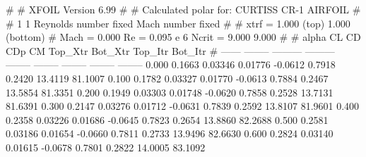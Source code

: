 #  
#       XFOIL         Version 6.99
#  
# Calculated polar for: CURTISS CR-1 AIRFOIL                            
#  
# 1 1 Reynolds number fixed          Mach number fixed         
#  
# xtrf =   1.000 (top)        1.000 (bottom)  
# Mach =   0.000     Re =     0.095 e 6     Ncrit =   9.000  9.000
#  
#   alpha    CL        CD       CDp       CM     Top_Xtr  Bot_Xtr  Top_Itr  Bot_Itr
#  ------ -------- --------- --------- -------- -------- -------- -------- --------
   0.000   0.1663   0.03346   0.01776  -0.0612   0.7918   0.2420  13.4119  81.1007
   0.100   0.1782   0.03327   0.01770  -0.0613   0.7884   0.2467  13.5854  81.3351
   0.200   0.1949   0.03303   0.01748  -0.0620   0.7858   0.2528  13.7131  81.6391
   0.300   0.2147   0.03276   0.01712  -0.0631   0.7839   0.2592  13.8107  81.9601
   0.400   0.2358   0.03226   0.01686  -0.0645   0.7823   0.2654  13.8860  82.2688
   0.500   0.2581   0.03186   0.01654  -0.0660   0.7811   0.2733  13.9496  82.6630
   0.600   0.2824   0.03140   0.01615  -0.0678   0.7801   0.2822  14.0005  83.1092

